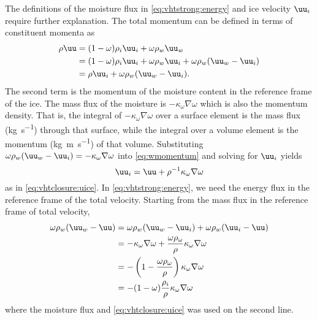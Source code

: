 The definitions of the moisture flux in \eqref{eq:vhtstrong:energy} and ice velocity $\uu_i$ require further explanation.
The total momentum can be defined in terms of constituent momenta as
\begin{equation}\label{eq:wmomentum}
  \begin{split}
    \rho\uu & = (1-\omega) \rho_i \uu_i + \omega \rho_w \uu_w                             \\
            & = (1-\omega) \rho_i \uu_i + \omega \rho_w \uu_i + \omega\rho_w(\uu_w - \uu_i) \\
            & = \rho \uu_i + \omega\rho_w(\uu_w - \uu_i) .
  \end{split}
\end{equation}
The second term is the momentum of the moisture content in the reference frame of the ice.
The mass flux of the moisture is $-\kappa_\omega\nabla\omega$ which is also the momentum density.
That is, the integral of $-\kappa_\omega\nabla\omega$ over a surface element is the mass flux (\si{\kilogram\per\second}) through that surface, while the integral over a volume element is the momentum (\si{\kilogram\metre\per\second}) of that volume.
Substituting $\omega\rho_w(\uu_w - \uu_i) = -\kappa_\omega\nabla\omega$ into \eqref{eq:wmomentum} and solving for $\uu_i$ yields
\begin{equation*}
  \uu_i = \uu + \rho^{-1} \kappa_\omega \nabla\omega
\end{equation*}
as in \eqref{eq:vhtclosure:uice}.
In \eqref{eq:vhtstrong:energy}, we need the energy flux in the reference frame of the total velocity.
Starting from the mass flux in the reference frame of total velocity,
\begin{equation}\label{eq:vhtmomflux}
  \begin{split}
    \omega\rho_w(\uu_w - \uu) & = \omega \rho_w (\uu_w - \uu_i) + \omega\rho_w(\uu_i - \uu)                             \\
                              & = -\kappa_\omega\nabla\omega + \frac{\omega\rho_\omega}{\rho}\kappa_\omega\nabla \omega \\
                              & = - \left( 1 - \frac{\omega\rho_\omega}{\rho} \right) \kappa_\omega \nabla \omega \\
                              & = - (1-\omega)\frac{\rho_i}{\rho}\kappa_\omega\nabla\omega
  \end{split}
\end{equation}
where the moisture flux and \eqref{eq:vhtclosure:uice} was used on the second line.
